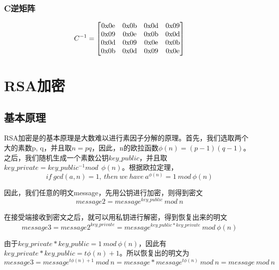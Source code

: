 \subsubsection*{C逆矩阵}

\begin{equation}
    C^{-1}=
    \left[\begin{matrix}
        {\rm 0x0e} & {\rm 0x0b} & {\rm 0x0d} & {\rm 0x09} \\
        {\rm 0x09} & {\rm 0x0e} & {\rm 0x0b} & {\rm 0x0d} \\
        {\rm 0x0d} & {\rm 0x09} & {\rm 0x0e} & {\rm 0x0b} \\
        {\rm 0x0b} & {\rm 0x0d} & {\rm 0x09} & {\rm 0x0e} \\
    \end{matrix}\right]
    \label{iC}
\end{equation}

\section{RSA加密}

\subsection{基本原理}

RSA加密是的基本原理是大数难以进行素因子分解的原理。首先，我们选取两个大的素数p, q，并且取$n=pq$，因此，n的欧拉函数$\phi(n)=(p-1)(q-1)$。之后，我们随机生成一个素数公钥$key\_public$，并且取$key\_private=key\_public^{-1} mod\ \  \phi(n)$。根据欧拉定理，
\begin{equation*}
if\ gcd(a,n)=1,\ then\ we\ have\ a^{\phi(n)}=1\ mod\ \phi(n)
\end{equation*}

因此，我们任意的明文message，先用公钥进行加密，则得到密文
\begin{equation*}
message2=message^{key\_public}\  mod\  n
\end{equation*}

在接受端接收到密文之后，就可以用私钥进行解密，得到恢复出来的明文
\begin{equation*}
message3=message2^{key\_private}=message^{key\_public*key\_private}\  mod\  \phi(n) 
\end{equation*}

由于$key\_private*key\_public=1\ mod\ \phi(n)$，因此有$key\_private*key\_public=t\phi(n)+1$。所以恢复出的明文为
\begin{equation*}
message3=message^{t\phi(n)+1}\ mod\ n=message*message^{t\phi(n)}\ mod\ n=message\ mod\ n
\end{equation*}

